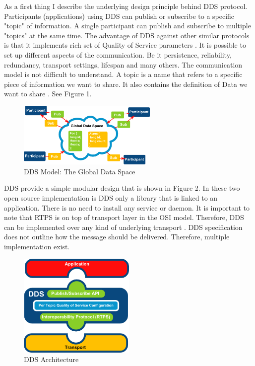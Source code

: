 \documentclass{csfourzero}
\begin{document}
\quad As a first thing I describe the underlying design principle behind DDS protocol. Participants (applications) using DDS can publish or subscribe to a specific "topic" of information. A single participant can publish and subscribe to multiple "topics" at the same time. The advantage of DDS against other similar protocols is that it implements rich set of Quality of Service parameters \cite{what-is-dds}. It is possible to set up different aspects of the communication. Be it persistence, reliability, redundancy, transport settings, lifespan and many others. The communication model is not difficult to understand. A topic is a name that refers to a specific piece of information we want to share. It also contains the definition of Data we want to share \cite{eprosima-dds}. See Figure 1.

\begin{figure}[h]
	\centering
	\includegraphics[width=0.6\textwidth]{GlobalDataSpace}
	\caption{\label{fig:GlobalDataSpace}DDS Model: The Global Data Space \cite{eprosima-dds}}
\end{figure}

DDS provide a simple modular design that is shown in Figure 2. In these two open source implementation is DDS only a library that is linked to an application. There is no need to install any service or daemon. It is important to note that RTPS is on top of transport layer in the OSI model. Therefore, DDS can be implemented over any kind of underlying transport \cite{eprosima-dds}. DDS specification does not outline how the message should be delivered. Therefore, multiple implementation exist.

\begin{figure}[h]
	\centering
	\includegraphics[width=0.5\textwidth]{DDSArch}
	\caption{\label{fig:DDSArch}DDS Architecture \cite{eprosima-dds}}
\end{figure}
\end{document}
